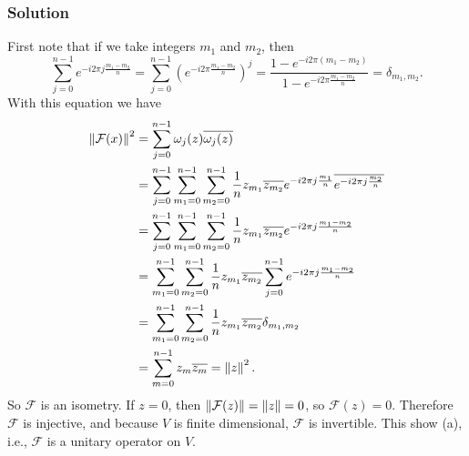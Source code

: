 \subsubsection*{Solution}

First note that if we take integers $m_1$ and $m_2$, then
\begin{equation*}
    \sum_{j = 0}^{n-1} e^{-i 2 \pi j \frac{m_1 - m_2}{n}}
        = \sum_{j = 0}^{n-1} \left( e^{-i 2 \pi \frac{m_1 - m_2}{n}} \right)^j
        = \frac{1 - e^{-i 2 \pi (m_1 - m_2)}}{1 - e^{-i 2 \pi \frac{m_1 - m_2}{n}}}
        = \delta_{m_1, m_2}.
\end{equation*}
With this equation we have
\begin{equation*}
    \begin{split}
        \left\lVert\mathcal{F}(x)\right\rVert^2
            &= \sum_{j = 0}^{n-1} \omega_j(z) \overline{\omega_j(z)} \\
            &= \sum_{j = 0}^{n-1} \sum_{m_1 = 0}^{n-1} \sum_{m_2 = 0}^{n-1} \frac{1}{n} z_{m_1} \overline{z_{m_2}} e^{-i 2 \pi j \frac{m_1}{n}} \overline{e^{-i 2 \pi j \frac{m_2}{n}}} \\
            &= \sum_{j = 0}^{n-1} \sum_{m_1 = 0}^{n-1} \sum_{m_2 = 0}^{n-1} \frac{1}{n} z_{m_1} \overline{z_{m_2}} e^{-i 2 \pi j \frac{m_1 - m_2}{n}} \\
            &= \sum_{m_1 = 0}^{n-1} \sum_{m_2 = 0}^{n-1} \frac{1}{n} z_{m_1} \overline{z_{m_2}} \sum_{j = 0}^{n-1} e^{-i 2 \pi j \frac{m_1 - m_2}{n}} \\
            &= \sum_{m_1 = 0}^{n-1} \sum_{m_2 = 0}^{n-1} \frac{1}{n} z_{m_1} \overline{z_{m_2}} \delta_{m_1, m_2} \\
            &= \sum_{m = 0}^{n-1} z_{m} \overline{z_{m}}
            = \left\lVert z\right\rVert^2.
    \end{split}
\end{equation*}
So $\mathcal{F}$ is an isometry.
If $z = 0$, then $\left\lVert\mathcal{F}(z)\right\rVert = \left\lVert z\right\rVert = 0$, so $\mathcal{F}(z) = 0$.
Therefore $\mathcal{F}$ is injective, and because $V$ is finite dimensional, $\mathcal{F}$ is invertible.
This show (a), i.e., $\mathcal{F}$ is a unitary operator on $V$.

